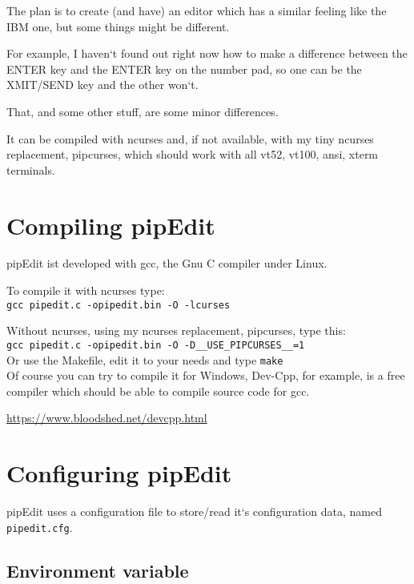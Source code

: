 \documentclass{report}
\begin{document}
The plan is to create (and have) an editor which has a similar feeling like the IBM one, but some things might be different. 


For example, I haven‘t found out right now how to make a difference between the ENTER key and the ENTER key on the number pad, so one can be the XMIT/SEND key and the other won‘t.


That, and some other stuff, are some minor differences.


It can be compiled with ncurses and, if not available, with my tiny ncurses replacement, pipcurses, which should work with all vt52, vt100, ansi, xterm terminals.



\chapter{Compiling pipEdit}

pipEdit ist developed with gcc, the Gnu C compiler under Linux.

To compile it with ncurses type: \\

\texttt{gcc pipedit.c -opipedit.bin -O -lcurses} \break

Without ncurses, using my ncurses replacement, pipcurses, type this: \\

\texttt{gcc pipedit.c -opipedit.bin -O -D\_\_USE\_PIPCURSES\_\_=1} \\

Or use the Makefile, edit it to your needs and type \texttt{make} \\

Of course you can try to compile it for Windows, Dev-Cpp, for example, is a free compiler which should be able to compile source code for gcc.

\url{https://www.bloodshed.net/devcpp.html}


\chapter{Configuring pipEdit}

pipEdit uses a configuration file to store/read it‘s configuration data, named \texttt{pipedit.cfg}.

\section{Environment variable}
\end{document}
